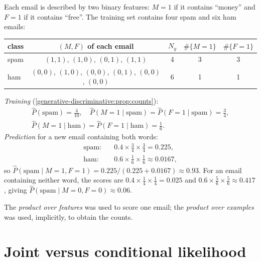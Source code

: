 \begin{notechapter}
\begin{example}\label{generative-discriminative:ex:spam}
Each email is described by two binary features: $M = 1$ if it contains
``money'' and $F = 1$ if it contains ``free''. The training set contains
four spam and six ham emails:
\begin{center}
\begin{tabular}{@{}lcccc@{}}
\toprule
class & $(M,F)$ of each email & $N_y$ & $\#\{M=1\}$ & $\#\{F=1\}$ \\
\midrule
spam & $(1,1)$, $(1,0)$, $(0,1)$, $(1,1)$ & 4 & 3 & 3 \\
ham  & $(0,0)$, $(1,0)$, $(0,0)$, $(0,1)$, $(0,0)$, $(0,0)$ & 6 & 1 & 1 \\
\bottomrule
\end{tabular}
\end{center}
\emph{Training} (\cref{generative-discriminative:prop:counts}):
\begin{gather*}
  \hat P(\text{spam}) = \tfrac{4}{10},\quad
  \hat P(M{=}1\mid\text{spam}) = \hat P(F{=}1\mid\text{spam}) = \tfrac34,\\
  \hat P(M{=}1\mid\text{ham}) = \hat P(F{=}1\mid\text{ham}) = \tfrac16 .
\end{gather*}
\emph{Prediction} for a new email containing both words:
\begin{align*}
  \text{spam}:&\quad 0.4\times\tfrac34\times\tfrac34 = 0.225,\\
  \text{ham}:&\quad 0.6\times\tfrac16\times\tfrac16 \approx 0.0167,
\end{align*}
so $\hat P(\text{spam}\mid M{=}1,F{=}1) = 0.225/(0.225 + 0.0167)\approx 0.93$.
For an email containing neither word, the scores are
$0.4\times\frac14\times\frac14 = 0.025$ and $0.6\times\frac56\times\frac56\approx0.417$,
giving $\hat P(\text{spam}\mid M{=}0,F{=}0)\approx0.06$.

The \emph{product over features} was used to score one email; the \emph{product
over examples} was used, implicitly, to obtain the counts.
\end{example}

\section{Joint versus conditional likelihood}\label{generative-discriminative:sec:joint-vs-conditional}


\end{notechapter}
